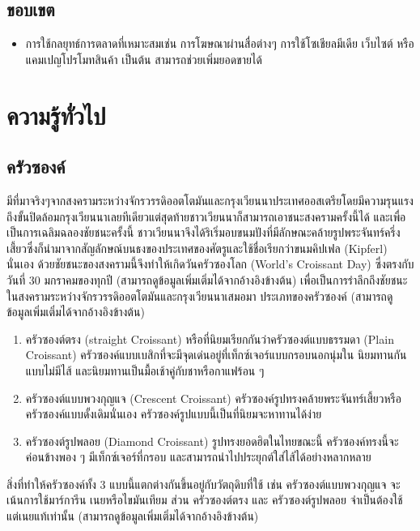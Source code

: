 \documentclass{report}
\begin{document}
\section{ขอบเขต}
\begin{itemize}
    \item{การใช้กลยุทธ์การตลาดที่เหมาะสมเช่น การโฆษณาผ่านสื่อต่างๆ การใช้โซเชียลมีเดีย เว็บไซต์ หรือแคมเปญโปรโมทสินค้า เป็นต้น สามารถช่วยเพิ่มยอดขายได้ }
\end{itemize}

\chapter{ความรู้ทั่วไป}
\section{ครัวซองค์}มีที่มาจริงๆจากสงครามระหว่างจักรวรรดิออตโตมันและกรุงเวียนนาประเทศออสเตรียโดยมีความรุนแรงถึงขั้นปิดล้อมกรุงเวียนนาเลยทีเดียวแต่สุดท้ายชาวเวียนนาก็สามารถเอาชนะสงครามครั้งนี้ได้ และเพื่อเป็นการเฉลิมฉลองชัยชนะครั้งนี้ ชาวเวียนนาจึงได้ริเริ่มอบขนมปังที่มีลักษณะคล้ายรูปพระจันทร์ครึ่งเสี้ยวซึ่งก็นํามาจากสัญลักษณ์บนธงของประเทศของศัตรูและใช้ชื่อเรียกว่าขนมคิปเฟล (Kipferl) นั่นเอง ด้วยชัยชนะของสงครามนี้จึงทำให้เกิดวันครัวซองโลก (World's Croissant Day) ซึ่งตรงกับวันที่ 30 มกราคมของทุกปี (สามารถดูข้อมูลเพิ่มเติ่มได้จากอ้างอิงข้างต้น) \cite{YOYO} เพื่อเป็นการรำลึกถึงชัยชนะในสงครามระหว่างจักรวรรดิออตโตมันและกรุงเวียนนาเสมอมา
ประเภทของครัวซองค์ (สามารถดูข้อมูลเพิ่มเติ่มได้จากอ้างอิงข้างต้น) \cite{KIKI}
\begin{enumerate} 
	\item ครัวซองต์ตรง (straight  Croissant) หรือที่นิยมเรียกกันว่าครัวซองต์แบบธรรมดา (Plain Croissant) ครัวซองค์แบบเบสิกที่จะมีจุดเด่นอยู่ที่เท็กซ์เจอร์แบบกรอบนอกนุ่มใน นิยมทานกันแบบไม่มีไส้ และนิยมทานเป็นมื้อเช้าคู่กับชาหรือกาแฟร้อน ๆ
	\item ครัวซองต์แบบพวงกุญแจ (Crescent Croissant) ครัวซองค์รูปทรงคล้ายพระจันทร์เสี้ยวหรือครัวซองค์แบบดั้งเดิมนั่นเอง ครัวซองค์รูปแบบนี้เป็นที่นิยมจะหาทานได้ง่าย
	\item ครัวซองต์รูปพลอย (Diamond Croissant) รูปทรงยอดฮิตในไทยขณะนี้ ครัวซองค์ทรงนี้จะค่อนข้างพอง ๆ มีเท็กซ์เจอร์ที่กรอบ และสามารถนำไปประยุกต์ใส่ไส้ได้อย่างหลากหลาย
\end{enumerate}
สิ่งที่ทำให้ครัวซองค์ทั้ง 3 แบบนี้แตกต่างกันขึ้นอยู่กับวัตถุดิบที่ใช้ เช่น ครัวซองต์แบบพวงกุญแจ จะเน้นการใช้มาร์การีน เนยหรือไขมันเทียม ส่วน ครัวซองต์ตรง และ ครัวซองต์รูปพลอย จำเป็นต้องใช้แต่เนยแท้เท่านั้น (สามารถดูข้อมูลเพิ่มเติ่มได้จากอ้างอิงข้างต้น) \cite{KIKI}\par
\end{document}
